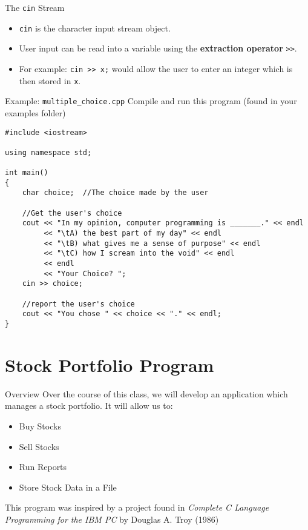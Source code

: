 \documentclass{beamer}
\begin{document}
\begin{frame}{The \texttt{cin} Stream}
    \begin{itemize}[<+->]
        \item \texttt{cin} is the character input stream object.
        \item User input can be read into a variable using the 
            \textbf{extraction operator} \texttt{>>}.
        \item For example:
            \newline\texttt{cin >> x;}
            \newline would allow the user to enter an integer which is
            then stored in \texttt{x}.
    \end{itemize}
\end{frame}

\begin{frame}[fragile]{Example: \texttt{multiple\_choice.cpp}}
Compile and run this program (found in your examples folder)

\begin{adjustbox}{max height=0.75\textheight}
\begin{BVerbatim}
#include <iostream>

using namespace std;

int main()
{
    char choice;  //The choice made by the user

    //Get the user's choice
    cout << "In my opinion, computer programming is _______." << endl
         << "\tA) the best part of my day" << endl
         << "\tB) what gives me a sense of purpose" << endl
         << "\tC) how I scream into the void" << endl
         << endl
         << "Your Choice? ";
    cin >> choice;

    //report the user's choice
    cout << "You chose " << choice << "." << endl;
}
\end{BVerbatim}
\end{adjustbox}
\end{frame}

\section{Stock Portfolio Program}
\begin{frame}{Overview}
Over the course of this class, we will develop an application which
manages a stock portfolio.  It will allow us to:
\begin{itemize}[<+->]
    \item Buy Stocks
    \item Sell Stocks
    \item Run Reports
    \item Store Stock Data in a File
\end{itemize}

{\tiny This program was inspired by a project found in {\em Complete
C Language Programming for the IBM PC} by Douglas A. Troy (1986)}
\end{frame}
\end{document}
